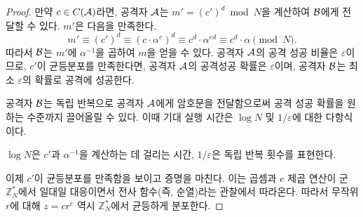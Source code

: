 \begin{proof}
    만약 $c \in C(\mathcal{A})$라면, 공격자 $\mathcal{A}$는 $m' = (c')^d \bmod N$을 계산하여
    $\mathcal{B}$에게 전달할 수 있다. $m'$은 다음을 만족한다.
    $$
        m' \equiv (c')^d 
        \equiv (c \cdot \alpha^e)^d 
        \equiv c^d \cdot \alpha^{ed} 
        \equiv c^d \cdot \alpha \pmod N.
    $$
    따라서 $\mathcal{B}$는 $m'$에 $\alpha^{-1}$을 곱하여 $m$을 얻을 수 있다. 공격자
    $\mathcal{A}$의 공격 성공 비율은 $\varepsilon$이므로, $c'$이 균등분포를 만족한다면,
    공격자 $\mathcal{A}$의 공격성공 확률은 $\varepsilon$이며, 공격자 $\mathcal{B}$는 최소
    $\varepsilon$의 확률로 공격에 성공한다. 

    공격자 $\mathcal{B}$는 독립 반복으로 공격자 $\mathcal{A}$에게 암호문을 전달함으로써 공격
    성공 확률을 원하는 수준까지 끌어올릴 수 있다. 이때 기대 실행 시간은 $\log N$
    및 $1/\varepsilon$에 대한 다항식이다.

    \begin{memo}
        $\log N$은 $c'$과 $\alpha^{-1}$을 계산하는 데 걸리는 시간,
        $1/\varepsilon$은 독립 반복 횟수를 표현한다.
    \end{memo}

    이제 $c'$이 균등분포를 만족함을 보이고 증명을 마친다. 이는 곱셈과 $e$ 제곱
    연산이 군 $\mathbb{Z}_N^*$에서 일대일 대응이면서 전사 함수(즉, 순열)라는
    관찰에서 따라온다. 따라서 무작위 $r$에 대해 $z = cr^e$ 역시
    $\mathbb{Z}_N^*$에서 균등하게 분포한다.
\end{proof}



